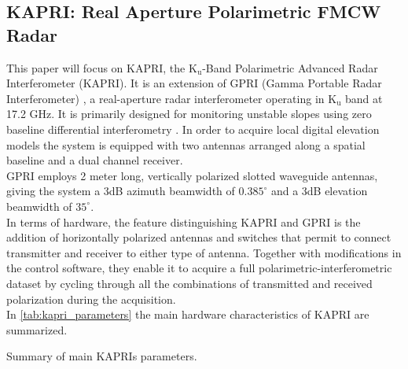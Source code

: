 \subsection{KAPRI: Real Aperture Polarimetric FMCW Radar}
This paper will focus on KAPRI, the $\mathrm{K_u}$-Band Polarimetric Advanced Radar Interferometer (KAPRI)\cite{Baffelli2016a}. It is an extension of GPRI (Gamma Portable Radar Interferometer) \cite{werner_gpri_2012,Strozzi2011, Werner2008}, a real-aperture radar interferometer operating in $\mathrm{K_u}$ band at 17.2 GHz. It is primarily designed 
for monitoring unstable slopes using zero baseline differential interferometry \cite{Massonnet1993}. In order to acquire local digital elevation models the system is equipped with two antennas arranged along a spatial baseline and a dual channel receiver.\\
GPRI employs  2 meter long, vertically polarized slotted waveguide antennas, giving the system a 3dB azimuth beamwidth of $0.385^\circ$ and a 3dB elevation beamwidth of $35^\circ$.\\
In terms of hardware, the feature distinguishing KAPRI and GPRI is the addition of horizontally polarized antennas and switches that permit to connect transmitter and receiver to either type of antenna. Together with modifications in the control software, they enable it to acquire a full polarimetric-interferometric dataset by cycling through all the combinations of transmitted and received polarization during the acquisition.\\  In \autoref{tab:kapri_parameters} the main hardware characteristics of KAPRI are summarized.
\begin{table*}
	\centering
	\caption{Summary of main KAPRIs parameters.}
	\label{tab:kapri_parameters}
\end{table*}
